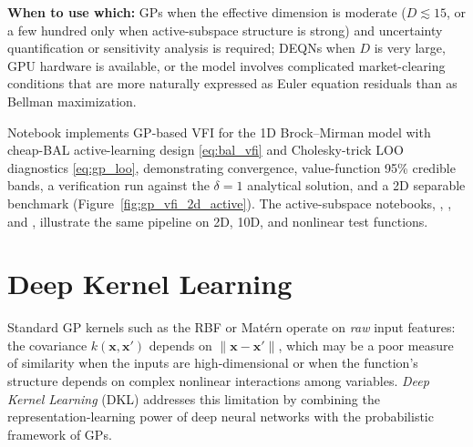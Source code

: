 \documentclass[11pt,a4paper]{report}
\newcommand{\x}{\bm{x}}
\begin{document}
\noindent \textbf{When to use which:} GPs when the effective dimension is moderate ($D \lesssim 15$, or a few hundred only when active-subspace structure is strong) and uncertainty quantification or sensitivity analysis is required; DEQNs when $D$ is very large, GPU hardware is available, or the model involves complicated market-clearing conditions that are more naturally expressed as Euler equation residuals than as Bellman maximization.

\begin{remarkbox}[Hands-on]
Notebook  implements GP-based VFI for the 1D Brock--Mirman model with cheap-BAL active-learning design \eqref{eq:bal_vfi} and Cholesky-trick LOO diagnostics \eqref{eq:gp_loo}, demonstrating convergence, value-function 95\% credible bands, a verification run against the $\delta = 1$ analytical solution, and a 2D separable benchmark (Figure~\ref{fig:gp_vfi_2d_active}).  The active-subspace notebooks, , , and , illustrate the same pipeline on 2D, 10D, and nonlinear test functions.
\end{remarkbox}


\section{Deep Kernel Learning}
\label{sec:dkl}

Standard GP kernels such as the RBF or Mat\'ern operate on \emph{raw} input features: the covariance $k(\x, \x')$ depends on $\|\x - \x'\|$, which may be a poor measure of similarity when the inputs are high-dimensional or when the function's structure depends on complex nonlinear interactions among variables.  \emph{Deep Kernel Learning} (DKL) \citep{wilson2016deep} addresses this limitation by combining the representation-learning power of deep neural networks with the probabilistic framework of GPs.
\end{document}
